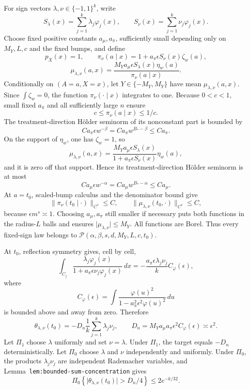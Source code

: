 For sign vectors \(\lambda,\nu\in\{-1,1\}^k\), write
\[
S_\lambda(x)=\sum_{j=1}^k\lambda_j\varphi_j(x),
\qquad
S_\nu(x)=\sum_{j=1}^k\nu_j\varphi_j(x).
\]
Choose fixed positive constants \(a_\mu,a_\pi\), sufficiently small depending only on \(M_Y,L,c\) and the fixed bumps, and define
\[
p_X(x)=1,
\qquad
\pi_\nu(a\mid x)=1+a_\pi\epsilon S_\nu(x)\zeta_w(a),
\]
\[
\mu_{\lambda,\nu}(a,x)
=
\frac{M_Ya_\mu\epsilon S_\lambda(x)\eta_w(a)}
{\pi_\nu(a\mid x)}.
\]
Conditionally on \((A=a,X=x)\), let \(Y\in\{-M_Y,M_Y\}\) have mean \(\mu_{\lambda,\nu}(a,x)\). Since \(\int\zeta_w=0\), the function \(\pi_\nu(\cdot\mid x)\) integrates to one. Because \(0<c<1\), small fixed \(a_\pi\) and all sufficiently large \(n\) ensure
\[
c\le\pi_\nu(a\mid x)\le1/c.
\]
The treatment-direction H\"older seminorm of its nonconstant part is bounded by
\[
C a_\pi\epsilon w^{-\beta}
=C a_\pi w^{B_*-\beta}\le C a_\pi.
\]
On the support of \(\eta_w\), one has \(\zeta_w=1\), so
\[
\mu_{\lambda,\nu}(a,x)
=
\frac{M_Ya_\mu\epsilon S_\lambda(x)}
{1+a_\pi\epsilon S_\nu(x)}\eta_w(a),
\]
and it is zero off that support. Hence its treatment-direction H\"older seminorm is at most
\[
C a_\mu\epsilon w^{-\alpha}
=C a_\mu w^{B_*-\alpha}\le C a_\mu.
\]
At \(a=t_0\), scaled-bump calculus and the denominator bound give
\[
\lVert\pi_\nu(t_0\mid\cdot)\rVert_{C^s}\le C,
\qquad
\lVert\mu_{\lambda,\nu}(t_0,\cdot)\rVert_{C^s}\le C,
\]
because \(\epsilon m^s\asymp1\). Choosing \(a_\mu,a_\pi\) still smaller if necessary puts both functions in the radius-\(L\) balls and ensures \(\lvert\mu_{\lambda,\nu}\rvert\le M_Y\). All functions are Borel. Thus every fixed-sign law belongs to \(\mathcal P(\alpha,\beta,s,d,M_Y,L,c,t_0)\).

At \(t_0\), reflection symmetry gives, cell by cell,
\[
\int_{C_j}
\frac{\lambda_j\varphi_j(x)}{1+a_\pi\epsilon\nu_j\varphi_j(x)}\,dx
=
-\frac{a_\pi\epsilon\lambda_j\nu_j}{k}
C_\varphi(\epsilon),
\]
where
\[
C_\varphi(\epsilon)
=
\int
\frac{\varphi(u)^2}{1-a_\pi^2\epsilon^2\varphi(u)^2}\,du
\]
is bounded above and away from zero. Therefore
\[
\theta_{\lambda,\nu}(t_0)
=
-D_n\frac1k\sum_{j=1}^k\lambda_j\nu_j,
\qquad
D_n=M_Ya_\mu a_\pi\epsilon^2C_\varphi(\epsilon)
\asymp\epsilon^2.
\]
Let \(\Pi_1\) choose \(\lambda\) uniformly and set \(\nu=\lambda\). Under \(\Pi_1\), the target equals \(-D_n\) deterministically. Let \(\Pi_0\) choose \(\lambda\) and \(\nu\) independently and uniformly. Under \(\Pi_0\), the products \(\lambda_j\nu_j\) are independent Rademacher variables, and Lemma~\texttt{lem:bounded-sum-concentration} gives
\[
\Pi_0\left\{\lvert\theta_{\lambda,\nu}(t_0)\rvert>D_n/4\right\}
\le2e^{-k/32}.
\]

